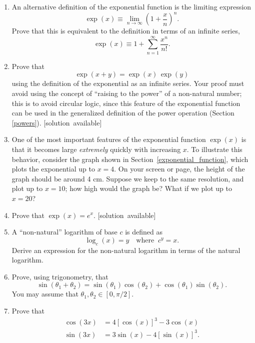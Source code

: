 \documentclass[10pt,a4paper]{article}
\begin{document}
\begin{enumerate}
  \def\labelenumi{\arabic{enumi}.}
\item
  An alternative definition of the exponential function is the limiting
  expression
  \begin{equation}
    \exp(x) \equiv \lim_{n\rightarrow\infty} \left(1+\frac{x}{n}\right)^n.
  \end{equation}
  Prove that this is equivalent to the definition in terms of an
  infinite series,
  \begin{equation}
    \exp(x) \equiv 1 + \sum_{n=1}^\infty\frac{x^n}{n!}.
  \end{equation}

\item
  Prove that
  \begin{equation}
    \exp(x+y) = \exp(x)\,\exp(y)
  \end{equation}
  using the definition of the exponential as an infinite series. Your
  proof must avoid using the concept of ``raising to the power'' of a
  non-natural number; this is to avoid circular logic, since this
  feature of the exponential function can be used in the generalized
  definition of the power operation (Section \ref{powers}).
  \hfill{\scriptsize [solution~available]}

\item
  One of the most important features of the exponential function
  $\exp(x)$ is that it becomes large \emph{extremely} quickly with
  increasing $x$. To illustrate this behavior, consider the graph
  shown in Section~\ref{exponential_function}, which plots the
  exponential up to $x = 4$.  On your screen or page, the height of
  the graph should be around 4 cm. Suppose we keep to the same
  resolution, and plot up to $x = 10$; how high would the graph be?
  What if we plot up to $x = 20$?

\item
  Prove that $\displaystyle \exp(x) = e^x.$
  \hfill{\scriptsize [solution~available]}

\item
  A ``non-natural'' logarithm of base $c$ is defined as
  \begin{equation}
    \log_c(x) = y \quad\mathrm{where}\;\; c^y = x.
  \end{equation}
  Derive an expression for the non-natural logarithm in terms of the
  natural logarithm.

\item
  Prove, using trigonometry, that
  \begin{equation}
    \sin(\theta_1 + \theta_2) = \sin(\theta_1) \cos(\theta_2) + \cos(\theta_1)\sin(\theta_2).
  \end{equation}
  You may assume that $\theta_1, \theta_2 \in [0, \pi/2].$

\item
  Prove that
  \begin{align}
    \cos(3x) &= 4[\cos(x)]^3 -3\cos(x) \\
    \sin(3x) &= 3\sin(x)-4[\sin(x)]^3.
  \end{align}
\end{enumerate}
\end{document}
